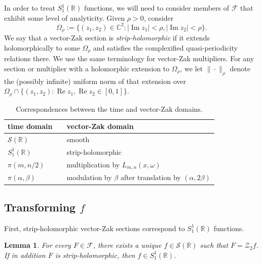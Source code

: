 \documentclass[10pt,a4paper]{amsart}
\newtheorem{lemma}[theorem]{Lemma}
\newcommand{\R}{\mathbb{R}}
\newcommand{\C}{\mathbb{C}}
\newcommand{\Sch}{\mathcal{S}}
\newcommand{\vZak}{\mathcal{Z}_2}
\begin{document}
In order to treat $S_1^1(\mathbb{R})$ functions, we will need to consider members of $\mathcal{F}$ that exhibit some level of analyticity.
Given $\rho>0$, consider
\[
  \Omega_\rho
  :=\{(z_1,z_2)\in\C^2:|\operatorname{Im}z_1|<\rho,
       |\operatorname{Im}z_2|<\rho\}.
\]
We say that a vector-Zak section is \emph{strip-holomorphic} if it extends
holomorphically to some $\Omega_\rho$ and satisfies the complexified quasi-periodicity
relations there.  We use the same terminology for vector-Zak multipliers.  
For any section or multiplier with a holomorphic extension to $\Omega_{\rho}$, we let $\|\cdot\|_{\rho}$ denote the (possibly infinite) uniform norm of that extension over $\Omega_{\rho}\cap\{(z_1,z_2):\operatorname{Re}z_1,\operatorname{Re}z_2\in[0,1]\}$.




\begin{table}
\centering
\begin{tabular}{lll}
\hline
time domain & \quad\quad & vector-Zak domain \\
\hline
$\mathcal{S}(\mathbb{R})$
    && smooth \\[2pt]
$S_1^1(\mathbb{R})$
    && strip-holomorphic \\[2pt]
$\pi(m,n/2)$
    && multiplication by $L_{m,n}(x,\omega)$ \\[2pt]
$\pi(\alpha,\beta)$
    && modulation by $\beta$ after translation by $(\alpha,2\beta)$\\\hline
\end{tabular}
\caption{Correspondences between the time and vector-Zak domains.}
\label{table.vector-Zak}
\end{table}

\subsection{Transforming $f$}

First, strip-holomorphic vector-Zak sections correspond to $S_1^1(\R)$ functions.

\begin{lemma}
\label{lem:analytic-zak}
For every $F\in\mathcal{F}$, there exists a unique $f\in\Sch(\R)$ such that $F=\vZak f$.
If in addition $F$ is strip-holomorphic, then
$f\in S_1^1(\R)$.
\end{lemma}
\end{document}
